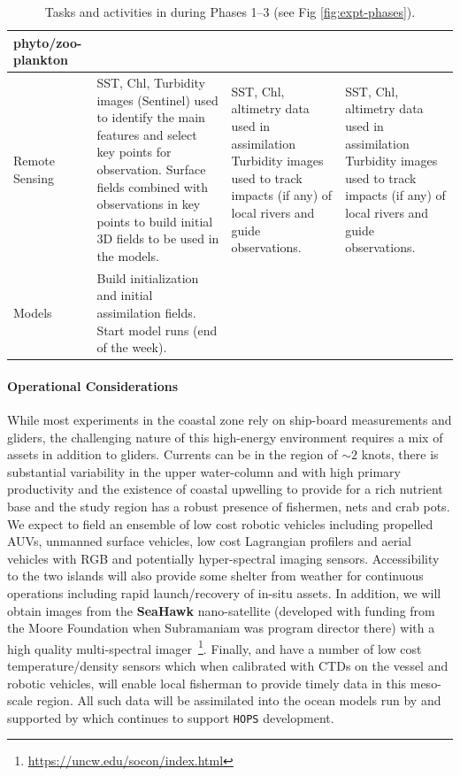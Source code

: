 \begin{table}[H]
{\begin{tabular}{|p{4cm}|p{4cm}|p{4cm}|p{4cm}|}
                                                                   phyto/zoo-plankton\\ 
    \hline
    Remote Sensing&SST, Chl, Turbidity images (Sentinel) used to
                    identify the main features and select key points for
                    observation. 
                    Surface fields combined with observations in key
                    points to build initial 3D fields to be used in the
                    models.&SST, Chl, altimetry data used in assimilation
                             Turbidity images used to track impacts (if
                             any) of local rivers and guide
                             observations.&SST, Chl, altimetry data used in assimilation
                                            Turbidity images used to
                                            track impacts (if any) of
                                            local rivers and guide
                                            observations.\\
    \hline
    Models&Build initialization and initial assimilation fields. 
            Start model runs (end of the week).&&\\
    \hline
  \end{tabular}
  \label{tab:tasks}
  \caption{Tasks and activities in \proj during Phases 1--3 (see Fig \ref{fig:expt-phases}).}
  }
\end{table}

\paragraph{Operational Considerations} While most experiments in the
coastal zone rely on ship-board measurements and gliders, the
challenging nature of this high-energy environment requires a mix of
assets in addition to gliders. Currents can be in the region of
$\sim 2$ knots, there is substantial variability in the upper
water-column and with high primary productivity and the existence of
coastal upwelling to provide for a rich nutrient base and the study
region has a robust presence of fishermen, nets and crab pots. We
expect to field an ensemble of low cost robotic vehicles including
propelled AUVs, unmanned surface vehicles, low cost Lagrangian
profilers and aerial vehicles with RGB and potentially hyper-spectral
imaging sensors. Accessibility to the two islands will also provide
some shelter from weather for continuous operations including rapid
launch/recovery of in-situ assets. In addition, we will obtain images
from the \textbf{SeaHawk} nano-satellite (developed with funding from
the Moore Foundation when Subramaniam was program director there) with
a high quality multi-spectral
imager~\footnote{\url{https://uncw.edu/socon/index.html}}. Finally,
\univ and \inst have a number of low cost temperature/density sensors
which when calibrated with CTDs on the vessel and robotic vehicles,
will enable local fisherman to provide timely data in this meso-scale
region. All such data will be assimilated into the ocean models run by
\inst and supported by \mit which continues to support \texttt{HOPS}
development.


